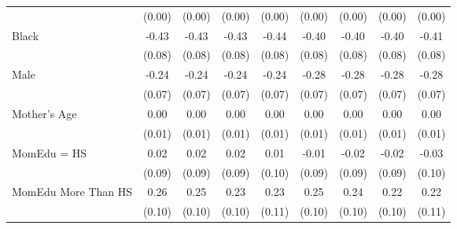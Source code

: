 {\begin{tabular}{l*{8}{c}}
                    &      (0.00)         &      (0.00)         &      (0.00)         &      (0.00)         &      (0.00)         &      (0.00)         &      (0.00)         &      (0.00)         \\
[1em]
Black               &       -0.43\sym{***}&       -0.43\sym{***}&       -0.43\sym{***}&       -0.44\sym{***}&       -0.40\sym{***}&       -0.40\sym{***}&       -0.40\sym{***}&       -0.41\sym{***}\\
                    &      (0.08)         &      (0.08)         &      (0.08)         &      (0.08)         &      (0.08)         &      (0.08)         &      (0.08)         &      (0.08)         \\
[1em]
Male                &       -0.24\sym{***}&       -0.24\sym{***}&       -0.24\sym{***}&       -0.24\sym{***}&       -0.28\sym{***}&       -0.28\sym{***}&       -0.28\sym{***}&       -0.28\sym{***}\\
                    &      (0.07)         &      (0.07)         &      (0.07)         &      (0.07)         &      (0.07)         &      (0.07)         &      (0.07)         &      (0.07)         \\
[1em]
Mother's Age        &        0.00         &        0.00         &        0.00         &        0.00         &        0.00         &        0.00         &        0.00         &        0.00         \\
                    &      (0.01)         &      (0.01)         &      (0.01)         &      (0.01)         &      (0.01)         &      (0.01)         &      (0.01)         &      (0.01)         \\
[1em]
MomEdu = HS         &        0.02         &        0.02         &        0.02         &        0.01         &       -0.01         &       -0.02         &       -0.02         &       -0.03         \\
                    &      (0.09)         &      (0.09)         &      (0.09)         &      (0.10)         &      (0.09)         &      (0.09)         &      (0.09)         &      (0.10)         \\
[1em]
MomEdu More Than HS &        0.26\sym{**} &        0.25\sym{**} &        0.23\sym{**} &        0.23\sym{**} &        0.25\sym{**} &        0.24\sym{**} &        0.22\sym{**} &        0.22\sym{**} \\
                    &      (0.10)         &      (0.10)         &      (0.10)         &      (0.11)         &      (0.10)         &      (0.10)         &      (0.10)         &      (0.11)         \\

\end{tabular}}
